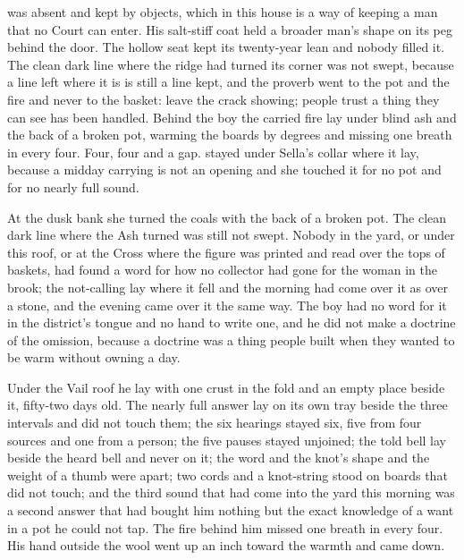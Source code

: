  was absent and kept by objects, which in this house is a way of keeping a man that no Court can enter. His salt-stiff coat held a broader man's shape on its peg behind the door. The hollow seat kept its twenty-year lean and nobody filled it. The clean dark line where the  ridge had turned its corner was not swept, because a line left where it is is still a line kept, and the proverb went to the pot and the fire and never to the basket: leave the crack showing; people trust a thing they can see has been handled. Behind the boy the carried fire lay under blind ash and the back of a broken pot, warming the boards by degrees and missing one breath in every four. Four, four and a gap.  stayed under Sella's collar where it lay, because a midday carrying is not an opening and she touched it for no pot and for no nearly full sound.

At the dusk bank she turned the coals with the back of a broken pot. The clean dark line where the Ash turned was still not swept. Nobody in the yard, or under this roof, or at the Cross where the figure was printed and read over the tops of baskets, had found a word for how no collector had gone for the woman in the brook; the not-calling lay where it fell and the morning had come over it as over a stone, and the evening came over it the same way. The boy had no word for it in the district's tongue and no hand to write one, and he did not make a doctrine of the omission, because a doctrine was a thing people built when they wanted to be warm without owning a day.

\scenebreak

Under the Vail roof he lay with one crust in the fold and an empty place beside it, fifty-two days old. The nearly full answer lay on its own tray beside the three intervals and did not touch them; the six hearings stayed six, five from four sources and one from a person; the five pauses stayed unjoined; the told bell lay beside the heard bell and never on it; the word and the knot's shape and the weight of a thumb were apart; two cords and a knot-string stood on boards that did not touch; and the third sound that had come into the yard this morning was a second answer that had bought him nothing but the exact knowledge of a want in a pot he could not tap. The fire behind him missed one breath in every four. His hand outside the wool went up an inch toward the warmth and came down.
